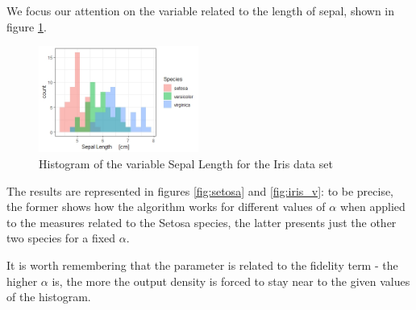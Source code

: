 We focus our attention on the variable related to the length of sepal, shown in figure \ref{fig:iris}.

\begin{figure}
	\includegraphics[height=3.5cm]{./pictures/iris/iris.jpeg}
	\centering
	\caption{Histogram of the variable Sepal Length for the Iris data set}
	\label{fig:iris}	
\end{figure}

The results are represented in figures \ref{fig:setosa} and \ref{fig:iris_v}: to be precise, the former shows how the algorithm works for different values of $\alpha$ when applied to the measures related to the Setosa species, the latter presents just the other two species for a fixed $\alpha$. 

It is worth remembering that the parameter is related to the fidelity term - the higher $\alpha$ is, the more the output density is forced to stay near to the given values of the histogram.

